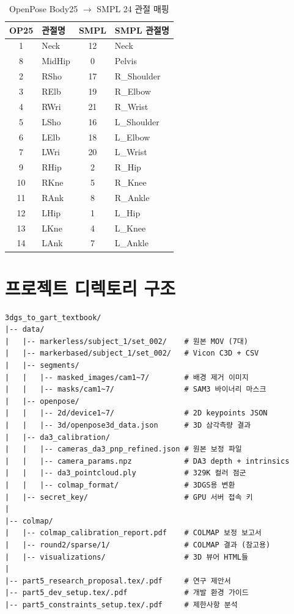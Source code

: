 \documentclass[11pt, a4paper]{report}
\begin{document}
\begin{table}[H]
\centering
\caption{OpenPose Body25 $\rightarrow$ SMPL 24 관절 매핑}
\renewcommand{\arraystretch}{1.2}
\small
\begin{tabular}{cl|cl}
\toprule
\textbf{OP25} & \textbf{관절명} & \textbf{SMPL} & \textbf{SMPL 관절명} \\
\midrule
1 & Neck & 12 & Neck \\
8 & MidHip & 0 & Pelvis \\
2 & RSho & 17 & R\_Shoulder \\
3 & RElb & 19 & R\_Elbow \\
4 & RWri & 21 & R\_Wrist \\
5 & LSho & 16 & L\_Shoulder \\
6 & LElb & 18 & L\_Elbow \\
7 & LWri & 20 & L\_Wrist \\
9 & RHip & 2 & R\_Hip \\
10 & RKne & 5 & R\_Knee \\
11 & RAnk & 8 & R\_Ankle \\
12 & LHip & 1 & L\_Hip \\
13 & LKne & 4 & L\_Knee \\
14 & LAnk & 7 & L\_Ankle \\
\bottomrule
\end{tabular}
\end{table}


\chapter{프로젝트 디렉토리 구조}

\begin{lstlisting}
3dgs_to_gart_textbook/
|-- data/
|   |-- markerless/subject_1/set_002/    # 원본 MOV (7대)
|   |-- markerbased/subject_1/set_002/   # Vicon C3D + CSV
|   |-- segments/
|   |   |-- masked_images/cam1~7/        # 배경 제거 이미지
|   |   |-- masks/cam1~7/                # SAM3 바이너리 마스크
|   |-- openpose/
|   |   |-- 2d/device1~7/                # 2D keypoints JSON
|   |   |-- 3d/openpose3d_data.json      # 3D 삼각측량 결과
|   |-- da3_calibration/
|   |   |-- cameras_da3_pnp_refined.json # 원본 보정 파일
|   |   |-- camera_params.npz            # DA3 depth + intrinsics
|   |   |-- da3_pointcloud.ply           # 329K 컬러 점군
|   |   |-- colmap_format/               # 3DGS용 변환
|   |-- secret_key/                      # GPU 서버 접속 키
|
|-- colmap/
|   |-- colmap_calibration_report.pdf    # COLMAP 보정 보고서
|   |-- round2/sparse/1/                 # COLMAP 결과 (참고용)
|   |-- visualizations/                  # 3D 뷰어 HTML들
|
|-- part5_research_proposal.tex/.pdf     # 연구 제안서
|-- part5_dev_setup.tex/.pdf             # 개발 환경 가이드
|-- part5_constraints_setup.tex/.pdf     # 제한사항 분석
\end{lstlisting}
\end{document}
